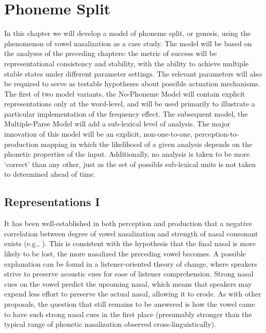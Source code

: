 \chapter{\label{chap:Phoneme-Split}Phoneme Split}

In this chapter we will develop a model of phoneme split, or genesis,
using the phenomenon of vowel nasalization as a case study. The model
will be based on the analyses of the preceding chapters: the metric
of success will be representational consistency and stability, with
the ability to achieve multiple stable states under different parameter
settings. The relevant parameters will also be required to serve as
testable hypotheses about possible actuation mechanisms. The first
of two model variants, the No-Phoneme Model will contain explicit
representations only at the word-level, and will be used primarily
to illustrate a particular implementation of the frequency effect.
The subsequent model, the Multiple-Parse Model will add a sub-lexical
level of analysis. The major innovation of this model will be an explicit,
non-one-to-one, perception-to-production mapping in which the likelihood
of a given analysis depends on the phonetic properties of the input.
Additionally, no analysis is taken to be more `correct' than any other,
just as the set of possible sub-lexical units is not taken to determined
ahead of time.

\section{Representations I}

It has been well-established in both perception and production that
a negative correlation between degree of vowel nasalization and strength
of nasal consonant exists (e.g., \citealt{kawasaki1978perceived,cohn1990phonetic}).
This is consistent with the hypothesis that the final nasal is more
likely to be lost, the more nasalized the preceding vowel becomes.
A possible explanation can be found in a listener-oriented theory
of change, where speakers strive to preserve acoustic cues for ease
of listener comprehension. Strong nasal cues on the vowel predict
the upcoming nasal, which means that speakers may expend less effort
to preserve the actual nasal, allowing it to erode. As with other
proposals, the question that still remains to be answered is how the
vowel came to have such strong nasal cues in the first place (presumably
stronger than the typical range of phonetic nasalization observed
cross-linguistically). 

